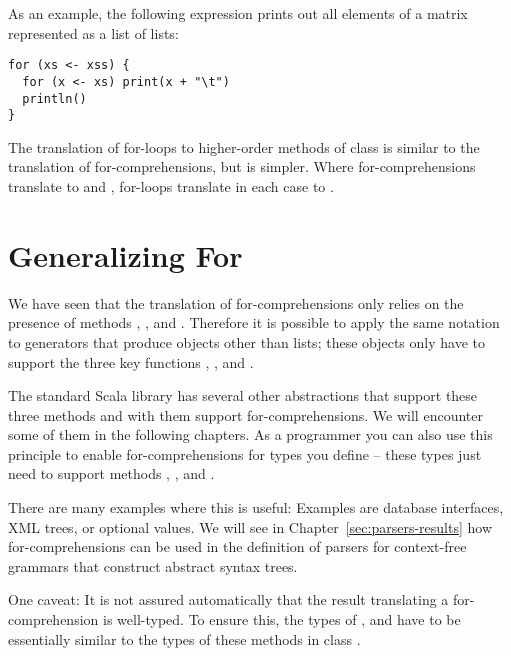 {As an example, the following expression prints out all elements of a
matrix represented as a list of lists:
 \begin{lstlisting}
for (xs <- xss) {
  for (x <- xs) print(x + "\t")
  println()
}
\end{lstlisting}
The translation of for-loops to higher-order methods of class
 is similar to the translation of for-comprehensions, but
is simpler. Where for-comprehensions translate to  and
, for-loops translate in each case to .

\section{Generalizing For}

We have seen that the translation of for-comprehensions only relies on
the presence of methods , , and
. Therefore it is possible to apply the same notation to
generators that produce objects other than lists; these objects only
have to support the three key functions , ,
and .

The standard Scala library has several other abstractions that support
these three methods and with them support for-comprehensions. We will
encounter some of them in the following chapters. As a programmer you
can also use this principle to enable for-comprehensions for types you
define -- these types just need to support methods ,
, and .

There are many examples where this is useful: Examples are database
interfaces, XML trees, or optional values. We will see in
Chapter~\ref{sec:parsers-results} how for-comprehensions can be used
in the definition of parsers for context-free grammars that construct
abstract syntax trees.

One caveat: It is not assured automatically that the result
translating a for-comprehension is well-typed. To ensure this, the
types of ,  and  have to be
essentially similar to the types of these methods in class .

}
